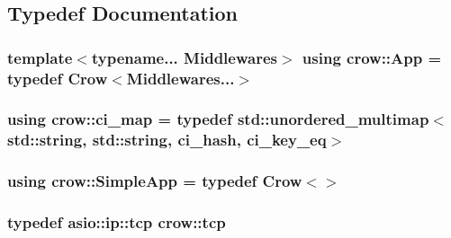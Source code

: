 \subsection{Typedef Documentation}
\hypertarget{namespacecrow_a153c1bf24903d1a8629ef6eaf045110b}{
\subsubsection[{App}]{\setlength{\rightskip}{0pt plus 5cm}template$<$typename... Middlewares$>$ using {\bf crow\-::\-App} = typedef {\bf Crow}$<$Middlewares...$>$}}\label{namespacecrow_a153c1bf24903d1a8629ef6eaf045110b}
\hypertarget{namespacecrow_a9090432313cd58380727a6c4384ee792}{
\subsubsection[{ci\-\_\-map}]{\setlength{\rightskip}{0pt plus 5cm}using {\bf crow\-::ci\-\_\-map} = typedef std\-::unordered\-\_\-multimap$<$std\-::string, std\-::string, {\bf ci\-\_\-hash}, {\bf ci\-\_\-key\-\_\-eq}$>$}}\label{namespacecrow_a9090432313cd58380727a6c4384ee792}
\hypertarget{namespacecrow_a3603179c9794548cac2c9990685178b4}{
\subsubsection[{Simple\-App}]{\setlength{\rightskip}{0pt plus 5cm}using {\bf crow\-::\-Simple\-App} = typedef {\bf Crow}$<$$>$}}\label{namespacecrow_a3603179c9794548cac2c9990685178b4}
\hypertarget{namespacecrow_a65f96f2358b6394677de6a13301e9e69}{
\subsubsection[{tcp}]{\setlength{\rightskip}{0pt plus 5cm}typedef asio\-::ip\-::tcp {\bf crow\-::tcp}}}\label{namespacecrow_a65f96f2358b6394677de6a13301e9e69}


